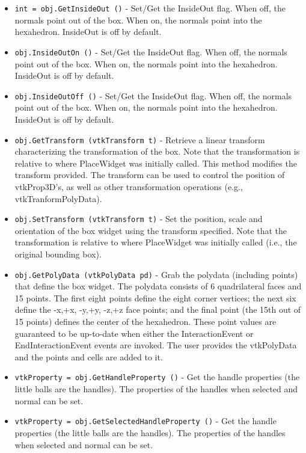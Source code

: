 \begin{itemize}
\item  \verb|int = obj.GetInsideOut ()| -  Set/Get the InsideOut flag. When off, the normals point out of the
 box. When on, the normals point into the hexahedron.  InsideOut
 is off by default.

\item  \verb|obj.InsideOutOn ()| -  Set/Get the InsideOut flag. When off, the normals point out of the
 box. When on, the normals point into the hexahedron.  InsideOut
 is off by default.

\item  \verb|obj.InsideOutOff ()| -  Set/Get the InsideOut flag. When off, the normals point out of the
 box. When on, the normals point into the hexahedron.  InsideOut
 is off by default.

\item  \verb|obj.GetTransform (vtkTransform t)| -  Retrieve a linear transform characterizing the transformation of the
 box. Note that the transformation is relative to where PlaceWidget
 was initially called. This method modifies the transform provided. The
 transform can be used to control the position of vtkProp3D's, as well as
 other transformation operations (e.g., vtkTranformPolyData).

\item  \verb|obj.SetTransform (vtkTransform t)| -  Set the position, scale and orientation of the box widget using the
 transform specified. Note that the transformation is relative to 
 where PlaceWidget was initially called (i.e., the original bounding
 box). 

\item  \verb|obj.GetPolyData (vtkPolyData pd)| -  Grab the polydata (including points) that define the box widget. The
 polydata consists of 6 quadrilateral faces and 15 points. The first
 eight points define the eight corner vertices; the next six define the
 -x,+x, -y,+y, -z,+z face points; and the final point (the 15th out of 15
 points) defines the center of the hexahedron. These point values are
 guaranteed to be up-to-date when either the InteractionEvent or
 EndInteractionEvent events are invoked. The user provides the
 vtkPolyData and the points and cells are added to it.

\item  \verb|vtkProperty = obj.GetHandleProperty ()| -  Get the handle properties (the little balls are the handles). The 
 properties of the handles when selected and normal can be 
 set.

\item  \verb|vtkProperty = obj.GetSelectedHandleProperty ()| -  Get the handle properties (the little balls are the handles). The 
 properties of the handles when selected and normal can be 
 set.


\end{itemize}
